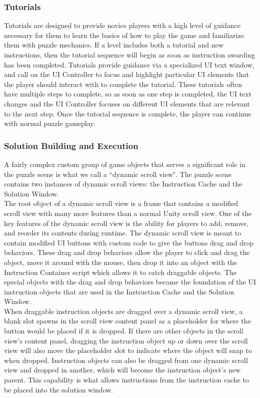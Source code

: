 \subsubsection{Tutorials}
Tutorials are designed to provide novice players with a high level of guidance necessary for them to learn the basics of how to play the game and familiarize them with puzzle mechanics. If a level includes both a tutorial and new instructions, then the tutorial sequence will begin as soon as instruction awarding has been completed. Tutorials provide guidance via a specialized UI text window, and call on the UI Controller to focus and highlight particular UI elements that the player should interact with to complete the tutorial. These tutorials often have multiple steps to complete, so as soon as one step is completed, the UI text changes and the UI Controller focuses on different UI elements that are relevant to the next step. Once the tutorial sequence is complete, the player can continue with normal puzzle gameplay.\\

\subsubsection{Solution Building and Execution}
A fairly complex custom group of game objects that serves a significant role in the puzzle scene is what we call a ``dynamic scroll view". The puzzle scene contains two instances of dynamic scroll views: the Instruction Cache and the Solution Window.\\

The root object of a dynamic scroll view is a frame that contains a modified scroll view with many more features than a normal Unity scroll view. One of the key features of the dynamic scroll view is the ability for players to add, remove, and reorder its contents during runtime. The dynamic scroll view is meant to contain modified UI buttons with custom code to give the buttons drag and drop behaviors. These drag and drop behaviors allow the player to click and drag the object, move it around with the mouse, then drop it into an object with the Instruction Container script which allows it to catch draggable objects. The special objects with the drag and drop behaviors became the foundation of the UI instruction objects that are used in the Instruction Cache and the Solution Window.\\

When draggable instruction objects are dragged over a dynamic scroll view, a blank slot spawns in the scroll view content panel as a placeholder for where the button would be placed if it is dropped. If there are other objects in the scroll view's content panel, dragging the instruction object up or down over the scroll view will also move the placeholder slot to indicate where the object will snap to when dropped. Instruction objects can also be dragged from one dynamic scroll view and dropped in another, which will become the instruction object's new parent. This capability is what allows instructions from the instruction cache to be placed into the solution window.\\

